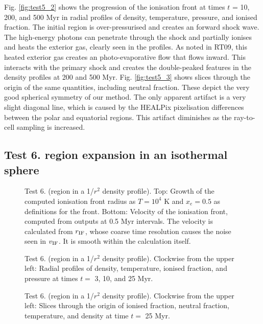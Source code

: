 \documentclass[useAMS,usenatbib]{mn2e}
\begin{document}
Fig. \ref{fig:test5_2} shows the progression of the ionisation front
at times $t$ = 10, 200, and 500 Myr in radial profiles of density,
temperature, pressure, and ionised fraction.  The initial \hii
region is over-pressurised and creates an forward shock wave.  The
high-energy photons can penetrate through the shock and partially
ionises and heats the exterior gas, clearly seen in the profiles.  As
noted in RT09, this heated exterior gas creates an photo-evaporative
flow that flows inward.  This interacts with the primary shock and
creates the double-peaked features in the density profiles at 200 and
500 Myr.  Fig. \ref{fig:test5_3} shows slices through the origin of
the same quantities, including neutral fraction.  These depict the
very good spherical symmetry of our method.  The only apparent
artifact is a very slight diagonal line, which is caused by the
HEALPix pixelisation differences between the polar and equatorial
regions.  This artifact diminishes as the ray-to-cell sampling is
increased.

\subsection{Test 6. \hii region expansion in an isothermal
  sphere}

\begin{figure}
  \caption{\label{fig:test6_1} Test 6. (\hii region in a 1/$r^2$
    density profile).  Top: Growth of the computed ionisation front
    radius as $T=10^4$ K and $x_e = 0.5$ as definitions for the front.
    Bottom: Velocity of the ionisation front, computed from outputs at
    0.5 Myr intervals.  The velocity is calculated from $r_{\rm IF}$,
    whose coarse time resolution causes the noise seen in $v_{\rm
      IF}$.  It is smooth within the calculation itself.}
\end{figure}

\begin{figure}
  \caption{\label{fig:test6_2} Test 6. (\hii region in a 1/$r^2$
    density profile).  Clockwise from the upper left: Radial profiles of
    density, temperature, ionised fraction, and pressure at times $t
    =$ 3, 10, and 25 Myr.}
\end{figure}

\begin{figure*}
  \caption{\label{fig:test6_3} Test 6. (\hii region in a 1/$r^2$
    density profile).  Clockwise from the upper left: Slices through the origin
    of ionised fraction, neutral fraction, temperature, and density at
    time $t =$ 25 Myr.}
\end{figure*}
\end{document}
